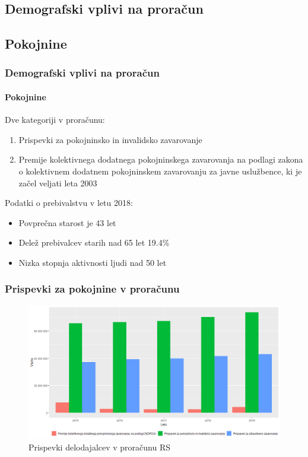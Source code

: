 \documentclass[10pt]{beamer}
\begin{document}
\begin{frame}
	\section[Demografski vplivi na proračun]{Demografski vplivi na proračun}
	\subsection[Pokojnine]{Pokojnine}
	\frametitle{Demografski vplivi na proračun}
	\framesubtitle{Pokojnine}
	Dve kategoriji v proračunu:
		\begin{enumerate}
			\item Prispevki za pokojninsko in invalidsko zavarovanje
			\item Premije kolektivnega dodatnega pokojninskega zavarovanja na podlagi zakona o kolektivnem dodatnem pokojninskem zavarovanju za javne uslužbence, ki je začel veljati leta 2003
		\end{enumerate}
	
	Podatki o prebivalstvu v letu 2018:
	\begin{itemize}
		\item Povprečna starost je 43 let
		\item Delež prebivalcev starih nad 65 let 19.4\%
		\item Nizka stopnja aktivnosti ljudi nad 50 let
	\end{itemize}
\end{frame}

\begin{frame}
	\frametitle{Prispevki za pokojnine v proračunu}
	\begin{figure}[h]
	\centering
	\includegraphics[width = 10 cm]{prispevki_delodajalcev_za_socialno_varnost_graf.png}
	\caption{Prispevki delodajalcev v proračunu RS}
	\label{Slika 3}
	\end{figure}
\end {frame}
\end{document}
